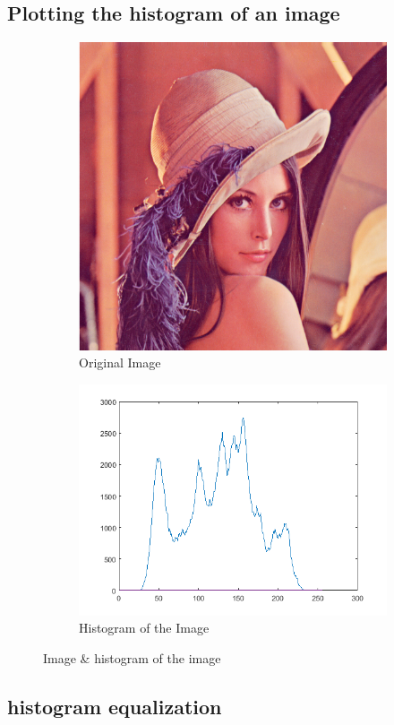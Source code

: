 \documentclass[a4paper,16pt]{article}
\begin{document}
	\subsection{Plotting the histogram of an image}
	\vspace{0.2in}
		
		\vspace{0.4in}
		\begin{figure}[h!]
			\begin{subfigure}[h]{0.4\linewidth}
				\includegraphics[width=\linewidth]{original}
				\caption{Original Image}
			\end{subfigure}
			\begin{subfigure}[h]{0.56\linewidth}
				\includegraphics[width=\linewidth]{histogram}
				\caption{Histogram of the Image}
			\end{subfigure}%
			\caption{Image \& histogram of the image}
		\end{figure}
	\newpage
	\subsection{histogram equalization}
	
\end{document}
